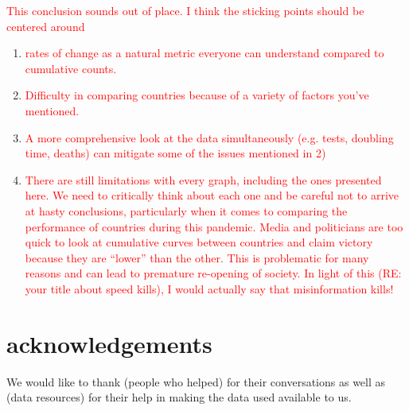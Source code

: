 \documentclass[alpha-refs]{wiley-article}
\newcommand{\sahir}[1]{\textcolor{red}{#1}}
\begin{document}
\sahir{This conclusion sounds out of place. I think the sticking points should be centered around} 
\begin{enumerate}
    \item \sahir{rates of change as a natural metric everyone can understand compared to cumulative counts. }
\item \sahir{Difficulty in comparing countries because of a variety of factors you've mentioned.} 
\item \sahir{A more comprehensive look at the data simultaneously (e.g. tests, doubling time, deaths) can mitigate some of the issues mentioned in 2)}
\item \sahir{There are still limitations with every graph, including the ones presented here. We need to critically think about each one and be careful not to arrive at hasty conclusions, particularly when it comes to comparing the performance of countries during this pandemic. Media and politicians are too quick to look at cumulative curves between countries and claim victory because they are ``lower'' than the other. This is problematic for many reasons and can lead to premature re-opening of society. In light of this (RE: your title about speed kills), I would actually say that misinformation kills!}
\end{enumerate}



\section*{acknowledgements}
We would like to thank (people who helped) for their conversations as well as (data resources) for their help in making the data used available to us.


\end{document}
